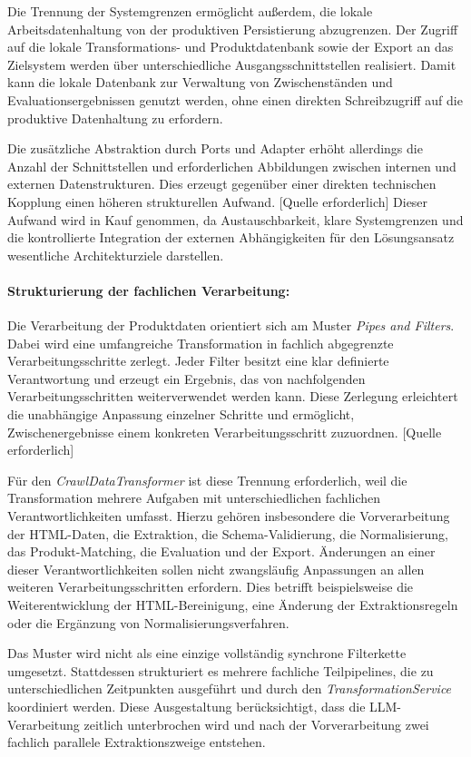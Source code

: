 Die Trennung der Systemgrenzen ermöglicht außerdem, die lokale Arbeitsdatenhaltung von der produktiven Persistierung abzugrenzen. Der Zugriff auf die lokale Transformations- 
und Produktdatenbank sowie der Export an das Zielsystem werden über unterschiedliche Ausgangsschnittstellen realisiert. Damit kann die lokale Datenbank zur Verwaltung von 
Zwischenständen und Evaluationsergebnissen genutzt werden, ohne einen direkten Schreibzugriff auf die produktive Datenhaltung zu erfordern.

Die zusätzliche Abstraktion durch Ports und Adapter erhöht allerdings die Anzahl der Schnittstellen und erforderlichen Abbildungen zwischen internen und externen 
Datenstrukturen. Dies erzeugt gegenüber einer direkten technischen Kopplung einen höheren strukturellen Aufwand. [Quelle erforderlich] Dieser Aufwand wird in Kauf genommen, 
da Austauschbarkeit, klare Systemgrenzen und die kontrollierte Integration der externen Abhängigkeiten für den Lösungsansatz wesentliche Architekturziele darstellen.

\paragraph{Strukturierung der fachlichen Verarbeitung:}

Die Verarbeitung der Produktdaten orientiert sich am Muster \textit{Pipes and Filters}. Dabei wird eine umfangreiche Transformation in fachlich abgegrenzte 
Verarbeitungsschritte zerlegt. Jeder Filter besitzt eine klar definierte Verantwortung und erzeugt ein Ergebnis, das von nachfolgenden Verarbeitungsschritten weiterverwendet 
werden kann. Diese Zerlegung erleichtert die unabhängige Anpassung einzelner Schritte und ermöglicht, Zwischenergebnisse einem konkreten Verarbeitungsschritt zuzuordnen. 
[Quelle erforderlich]

Für den \textit{CrawlDataTransformer} ist diese Trennung erforderlich, weil die Transformation mehrere Aufgaben mit unterschiedlichen fachlichen Verantwortlichkeiten umfasst. 
Hierzu gehören insbesondere die Vorverarbeitung der HTML-Daten, die Extraktion, die Schema-Validierung, die Normalisierung, das Produkt-Matching, die Evaluation und der Export. 
Änderungen an einer dieser Verantwortlichkeiten sollen nicht zwangsläufig Anpassungen an allen weiteren Verarbeitungsschritten erfordern. Dies betrifft beispielsweise die 
Weiterentwicklung der HTML-Bereinigung, eine Änderung der Extraktionsregeln oder die Ergänzung von Normalisierungsverfahren.

Das Muster wird nicht als eine einzige vollständig synchrone Filterkette umgesetzt. Stattdessen strukturiert es mehrere fachliche Teilpipelines, die zu unterschiedlichen 
Zeitpunkten ausgeführt und durch den \textit{TransformationService} koordiniert werden. Diese Ausgestaltung berücksichtigt, dass die LLM-Verarbeitung zeitlich unterbrochen 
wird und nach der Vorverarbeitung zwei fachlich parallele Extraktionszweige entstehen.

